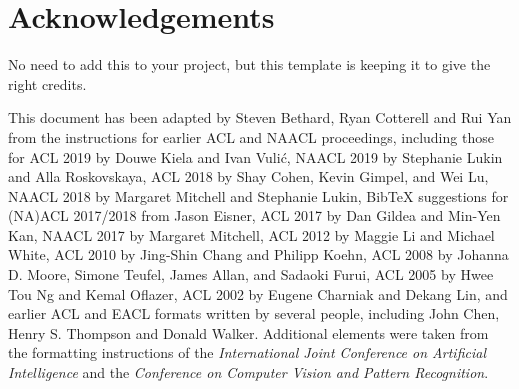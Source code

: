 \documentclass[11pt]{article}
\begin{document}
\section*{Acknowledgements}
No need to add this to your project, but this template is keeping it to give the right credits.

This document has been adapted
by Steven Bethard, Ryan Cotterell and Rui Yan
from the instructions for earlier ACL and NAACL proceedings, including those for 
ACL 2019 by Douwe Kiela and Ivan Vuli\'{c},
NAACL 2019 by Stephanie Lukin and Alla Roskovskaya, 
ACL 2018 by Shay Cohen, Kevin Gimpel, and Wei Lu, 
NAACL 2018 by Margaret Mitchell and Stephanie Lukin,
Bib\TeX{} suggestions for (NA)ACL 2017/2018 from Jason Eisner,
ACL 2017 by Dan Gildea and Min-Yen Kan, 
NAACL 2017 by Margaret Mitchell, 
ACL 2012 by Maggie Li and Michael White, 
ACL 2010 by Jing-Shin Chang and Philipp Koehn, 
ACL 2008 by Johanna D. Moore, Simone Teufel, James Allan, and Sadaoki Furui, 
ACL 2005 by Hwee Tou Ng and Kemal Oflazer, 
ACL 2002 by Eugene Charniak and Dekang Lin, 
and earlier ACL and EACL formats written by several people, including
John Chen, Henry S. Thompson and Donald Walker.
Additional elements were taken from the formatting instructions of the \emph{International Joint Conference on Artificial Intelligence} and the \emph{Conference on Computer Vision and Pattern Recognition}.



\end{document}
